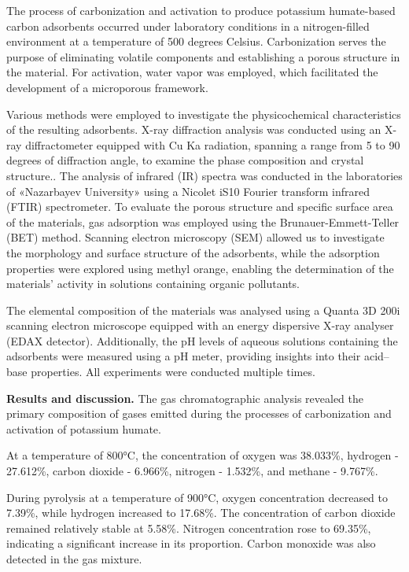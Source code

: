 \begin{multicols}{2}
The process of carbonization and activation to produce potassium
humate-based carbon adsorbents occurred under laboratory conditions in a
nitrogen-filled environment at a temperature of 500 degrees Celsius.
Carbonization serves the purpose of eliminating volatile components and
establishing a porous structure in the material. For activation, water
vapor was employed, which facilitated the development of a microporous
framework.

Various methods were employed to investigate the physicochemical
characteristics of the resulting adsorbents. X-ray diffraction analysis
was conducted using an X-ray diffractometer equipped with Cu Ka
radiation, spanning a range from 5 to 90 degrees of diffraction angle,
to examine the phase composition and crystal structure.. The analysis of
infrared (IR) spectra was conducted in the laboratories of «Nazarbayev
University» using a Nicolet iS10 Fourier transform infrared (FTIR)
spectrometer. To evaluate the porous structure and specific surface area
of the materials, gas adsorption was employed using the
Brunauer-Emmett-Teller (BET) method. Scanning electron microscopy (SEM)
allowed us to investigate the morphology and surface structure of the
adsorbents, while the adsorption properties were explored using methyl
orange, enabling the determination of the materials'{}
activity in solutions containing organic pollutants.

The elemental composition of the materials was analysed using a Quanta
3D 200i scanning electron microscope equipped with an energy dispersive
X-ray analyser (EDAX detector). Additionally, the pH levels of aqueous
solutions containing the adsorbents were measured using a pH meter,
providing insights into their acid--base properties. All experiments
were conducted multiple times.

{\bfseries Results and discussion.} The gas chromatographic analysis
revealed the primary composition of gases emitted during the processes
of carbonization and activation of potassium humate.

At a temperature of 800°C, the concentration of oxygen was 38.033\%,
hydrogen - 27.612\%, carbon dioxide - 6.966\%, nitrogen - 1.532\%, and
methane - 9.767\%.

During pyrolysis at a temperature of 900°C, oxygen concentration
decreased to 7.39\%, while hydrogen increased to 17.68\%. The
concentration of carbon dioxide remained relatively stable at 5.58\%.
Nitrogen concentration rose to 69.35\%, indicating a significant
increase in its proportion. Carbon monoxide was also detected in the gas
mixture.


\end{multicols}

